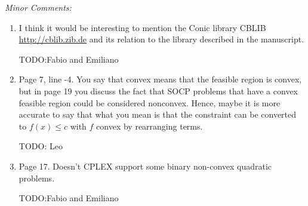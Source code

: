 \documentclass[11pt]{article}
\newcommand{\rep}[1]{{\textcolor{acblue}{#1}}}
\newcommand{\leo}[1]{{\color{red}#1}}
\begin{document}
{\it
Minor Comments:
\begin{enumerate}

\item I think it would be interesting to mention the Conic library CBLIB \url{http://cblib.zib.de} and its relation to the library described in the manuscript.

\rep{TODO:Fabio and Emiliano}


\item Page 7, line -4. You say that convex means that the feasible region is
convex, but in page 19 you discuss the fact that SOCP problems that have
a convex feasible region could be considered nonconvex. Hence, maybe it
is more accurate to say that what you mean is that the constraint can be
converted to $f (x) \le c$ with $f$ convex by rearranging terms.

\rep{ TODO: Leo 
}

\item Page 17. Doesn't CPLEX support some binary non-convex quadratic
problems.

\rep{ TODO:Fabio and Emiliano
}


\end{enumerate}}
\end{document}
